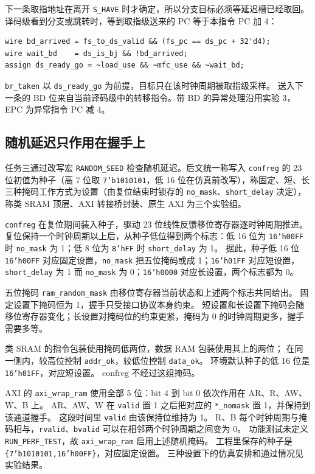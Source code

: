 \documentclass{article}
\begin{document}
下一条取指地址在离开 \texttt{S\_HAVE} 时才确定，所以分支目标必须等延迟槽已经取回。
译码级看到分支或跳转时，等到取指级送来的 PC 等于本指令 PC 加 4：
\begin{verbatim}
wire bd_arrived = fs_to_ds_valid && (fs_pc == ds_pc + 32'd4);
wire wait_bd    = ds_is_bj && !bd_arrived;
assign ds_ready_go = ~load_use && ~mfc_use && ~wait_bd;
\end{verbatim}
\texttt{br\_taken} 以 \texttt{ds\_ready\_go} 为前提，目标只在该时钟周期被取指级采样。
送入下一条的 BD 位来自当前译码级中的转移指令。带 BD 的异常处理沿用实验 3，EPC 为异常指令 PC 减 4。

\subsection{随机延迟只作用在握手上}
任务三通过改写宏 \texttt{RANDOM\_SEED} 检查随机延迟。后文统一称写入 \texttt{confreg} 的 23 位初值为种子（高 7 位取 \texttt{7'b1010101}，低 16 位在仿真前改写），称固定、短、长三种掩码工作方式为设置（由复位结束时锁存的 \texttt{no\_mask}、\texttt{short\_delay} 决定），称类 SRAM 顶层、AXI 转接桥封装、原生 AXI 为三个实验组。

\texttt{confreg} 在复位期间装入种子，驱动 23 位线性反馈移位寄存器逐时钟周期推进。
复位保持一个时钟周期以上后，从种子低位得到两个标志：低 16 位为 \texttt{16'h00FF} 时 \texttt{no\_mask} 为 1；低 8 位为 \texttt{8'hFF} 时 \texttt{short\_delay} 为 1。
据此，种子低 16 位 \texttt{16'h00FF} 对应固定设置，\texttt{no\_mask} 把五位掩码或成 1；\texttt{16'h01FF} 对应短设置，\texttt{short\_delay} 为 1 而 \texttt{no\_mask} 为 0；\texttt{16'h0000} 对应长设置，两个标志都为 0。

五位掩码 \texttt{ram\_random\_mask} 由移位寄存器当前状态和上述两个标志共同给出。
固定设置下掩码恒为 1，握手只受接口协议本身约束。
短设置和长设置下掩码会随移位寄存器变化；长设置对掩码位的约束更紧，掩码为 0 的时钟周期更多，握手需要多等。

类 SRAM 的指令包装使用掩码低两位，数据 RAM 包装使用其上的两位；
在同一侧内，较高位控制 \texttt{addr\_ok}，较低位控制 \texttt{data\_ok}。
环境默认种子的低 16 位是 \texttt{16'h01FF}，对应短设置。
confreg 不经过这组掩码。

AXI 的 \texttt{axi\_wrap\_ram} 使用全部 5 位：bit 4 到 bit 0 依次作用在 AR、R、AW、W、B 上。
AR、AW、W 在 \texttt{valid} 置 1 之后把对应的 \texttt{*\_nomask} 置 1，并保持到该通道握手。
这段时间里 \texttt{valid} 由该保持位维持为 1。
R、B 每个时钟周期与掩码相与，\texttt{rvalid}、\texttt{bvalid} 可以在相邻两个时钟周期之间变为 0。
功能测试未定义 \texttt{RUN\_PERF\_TEST}，故 \texttt{axi\_wrap\_ram} 启用上述随机掩码。
工程里保存的种子是 \texttt{\{7'b1010101,16'h00FF\}}，对应固定设置。
三种设置下的仿真安排和通过情况见实验结果。
\end{document}
